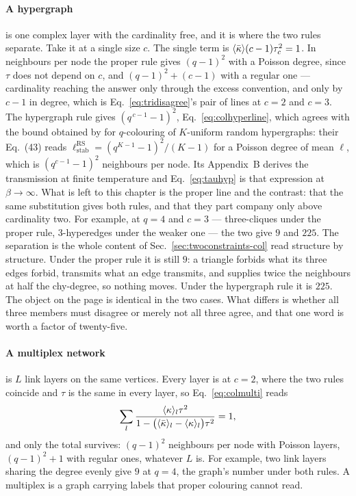 \paragraph{A hypergraph} is one complex layer with the cardinality free, and it
is where the two rules separate. Take it at a single size $c$. The single term is $\langle \bar\kappa \rangle(c-1)\tau_{c}^{2}=1$. In
neighbours per node the proper rule gives $(q-1)^{2}$ with a Poisson degree,
since $\tau$ does not depend on $c$, and $(q-1)^{2}+(c-1)$ with a regular one
--- cardinality reaching the answer only through the excess convention, and
only by $c-1$ in degree, which is Eq.~\eqref{eq:tridisagree}'s pair of lines at
$c=2$ and $c=3$. The hypergraph rule gives $(q^{\,c-1}-1)^{2}$,
Eq.~\eqref{eq:colhyperline}, which agrees with the bound obtained by
\citet{gabrie2017} for $q$-colouring of $K$-uniform random hypergraphs: their
Eq.~(43) reads $\ell^{\mathrm{RS}}_{\mathrm{stab}}=(q^{K-1}-1)^{2}/(K-1)$ for a
Poisson degree of mean $\ell$, which is $(q^{c-1}-1)^{2}$ neighbours per node.
Its Appendix~B derives the transmission at finite temperature and
Eq.~\eqref{eq:tauhyp} is that expression at $\beta\to\infty$. What is left to
this chapter is the proper line and the contrast: that the same substitution
gives both rules, and that they part company only above cardinality two. For example, at $q=4$ and $c=3$ --- three-cliques under
the proper rule, $3$-hyperedges under the weaker one --- the two give $9$ and
$225$. The separation is the whole content of
Sec.~\ref{sec:twoconstraints-col} read structure by structure. Under the proper rule it is still $9$: a triangle
forbids what its three edges forbid, transmits what an edge transmits, and
supplies twice the neighbours at half the chy-degree, so nothing moves. Under
the hypergraph rule it is $225$. The object on the page is identical in the two
cases. What differs is whether all three members must disagree or merely not all
three agree, and that one word is worth a factor of twenty-five.

\paragraph{A multiplex network} is $L$ link layers on the same vertices. Every
layer is at $c=2$, where the two rules coincide and $\tau$ is the same in every
layer, so Eq.~\eqref{eq:colmulti} reads
\[
  \sum_{l}\frac{\langle \kappa \rangle_{l}\tau^{2}}
                {1-\bigl(\langle \bar\kappa \rangle_{l}-\langle \kappa \rangle_{l}\bigr)\tau^{2}}=1,
\]
and only the total survives: $(q-1)^{2}$ neighbours per node with Poisson
layers, $(q-1)^{2}+1$ with regular ones, whatever $L$ is. For example, two link
layers sharing the degree evenly give $9$ at $q=4$, the graph's number under
both rules. A multiplex is a graph carrying labels that proper colouring
cannot read.


